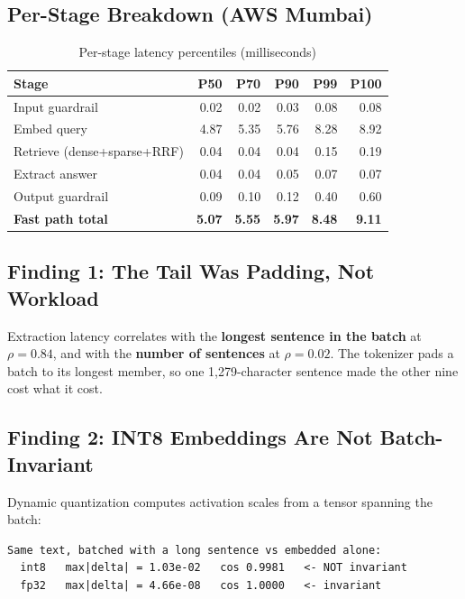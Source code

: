 \documentclass[12pt,a4paper]{article}
\begin{document}
\subsection{Per-Stage Breakdown (AWS Mumbai)}

\begin{table}[H]
\centering
\begin{tabular}{lrrrrr}
\toprule
\textbf{Stage} & \textbf{P50} & \textbf{P70} & \textbf{P90} & \textbf{P99} & \textbf{P100} \\
\midrule
Input guardrail                  & 0.02 & 0.02 & 0.03 & 0.08 & 0.08 \\
Embed query                      & 4.87 & 5.35 & 5.76 & 8.28 & 8.92 \\
Retrieve (dense+sparse+RRF)      & 0.04 & 0.04 & 0.04 & 0.15 & 0.19 \\
Extract answer                   & 0.04 & 0.04 & 0.05 & 0.07 & 0.07 \\
Output guardrail                 & 0.09 & 0.10 & 0.12 & 0.40 & 0.60 \\
\midrule
\textbf{Fast path total}         & \textbf{5.07} & \textbf{5.55} & \textbf{5.97} & \textbf{8.48} & \textbf{9.11} \\
\bottomrule
\end{tabular}
\caption{Per-stage latency percentiles (milliseconds)}
\end{table}

\subsection{Finding 1: The Tail Was Padding, Not Workload}

Extraction latency correlates with the \textbf{longest sentence in the batch} at $\rho = 0.84$, and with the \textbf{number of sentences} at $\rho = 0.02$. The tokenizer pads a batch to its longest member, so one 1,279-character sentence made the other nine cost what it cost.

\subsection{Finding 2: INT8 Embeddings Are Not Batch-Invariant}

Dynamic quantization computes activation scales from a tensor spanning the batch:

\begin{lstlisting}[style=bashstyle, language={}]
Same text, batched with a long sentence vs embedded alone:
  int8   max|delta| = 1.03e-02   cos 0.9981   <- NOT invariant
  fp32   max|delta| = 4.66e-08   cos 1.0000   <- invariant
\end{lstlisting}
\end{document}
